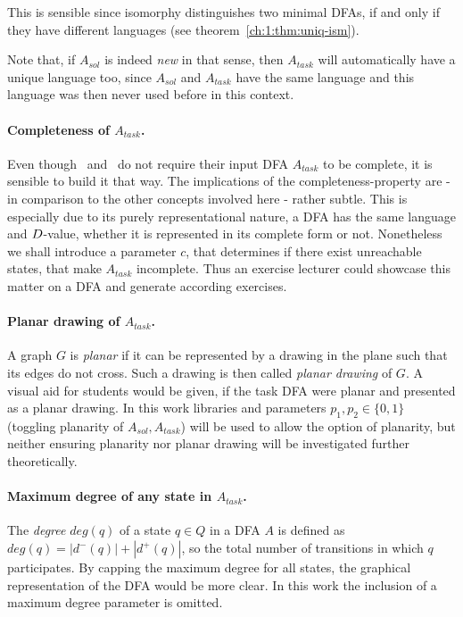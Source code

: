 This is sensible since isomorphy distinguishes two minimal DFAs, if and only if they have different languages (see theorem~\ref{ch:1:thm:uniq-ism}).

Note that, if $A_{sol}$ is indeed \emph{new} in that sense, then $A_{task}$ will automatically have a unique language too, since $A_{sol}$ and $A_{task}$ have the same language and this language was then never used before in this context.

\paragraph*{Completeness of $A_{task}$.}

Even though \CompUnr\ and \RemUnr\ do not require their input DFA $A_{task}$ to be complete, it is sensible to build it that way. The implications of the completeness-property are - in comparison to the other concepts involved here - rather subtle. This is especially due to its purely representational nature, a DFA has the same language and $D$-value, whether it is represented in its complete form or not. Nonetheless we shall introduce a parameter $c$, that determines if there exist unreachable states, that make $A_{task}$ incomplete. Thus an exercise lecturer could showcase this matter on a DFA and generate according exercises.

\paragraph*{Planar drawing of $A_{task}$.}

A graph $G$ is \emph{planar} if it can be represented by a drawing in the plane such that its edges do not cross. Such a drawing is then called \emph{planar drawing} of $G$. A visual aid for students would be given, if the task DFA were planar and presented as a planar drawing. In this work libraries and parameters $p_1, p_2 \in \{0,1\}$ (toggling planarity of $A_{sol}, A_{task}$) will be used to allow the option of planarity, but neither ensuring planarity nor planar drawing will be investigated further theoretically.

\paragraph*{Maximum degree of any state in $A_{task}$.}

The \emph{degree} $deg(q)$ of a state $q \in Q$ in a DFA $A$ is defined as $deg(q) = |d^-(q)| + |d^+(q)|$, so the total number of transitions in which $q$ participates. By capping the maximum degree for all states, the graphical representation of the DFA would be more clear. In this work the inclusion of a maximum degree parameter is omitted.

